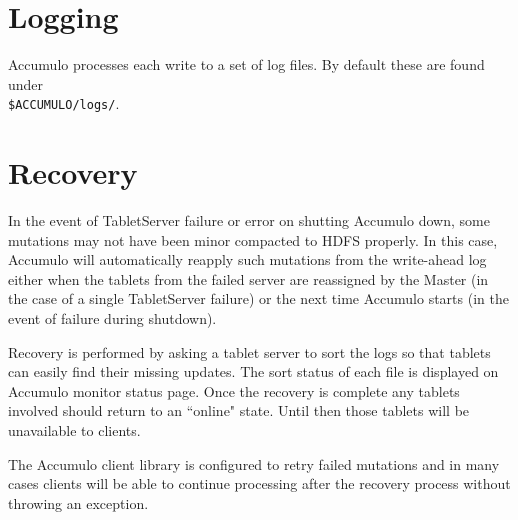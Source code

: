 \section{Logging}
Accumulo processes each write to a set of log files. By default these are found under\\
\texttt{\$ACCUMULO/logs/}.

\section{Recovery}

In the event of TabletServer failure or error on shutting Accumulo down, some
mutations may not have been minor compacted to HDFS properly. In this case,
Accumulo will automatically reapply such mutations from the write-ahead log
either when the tablets from the failed server are reassigned by the Master (in the
case of a single TabletServer failure) or the next time Accumulo starts (in the event of
failure during shutdown).

Recovery is performed by asking a tablet server to sort the logs so that tablets can easily find their missing
updates. The sort status of each file is displayed on
Accumulo monitor status page. Once the recovery is complete any
tablets involved should return to an ``online" state. Until then those tablets will be
unavailable to clients.

The Accumulo client library is configured to retry failed mutations and in many
cases clients will be able to continue processing after the recovery process without
throwing an exception.

